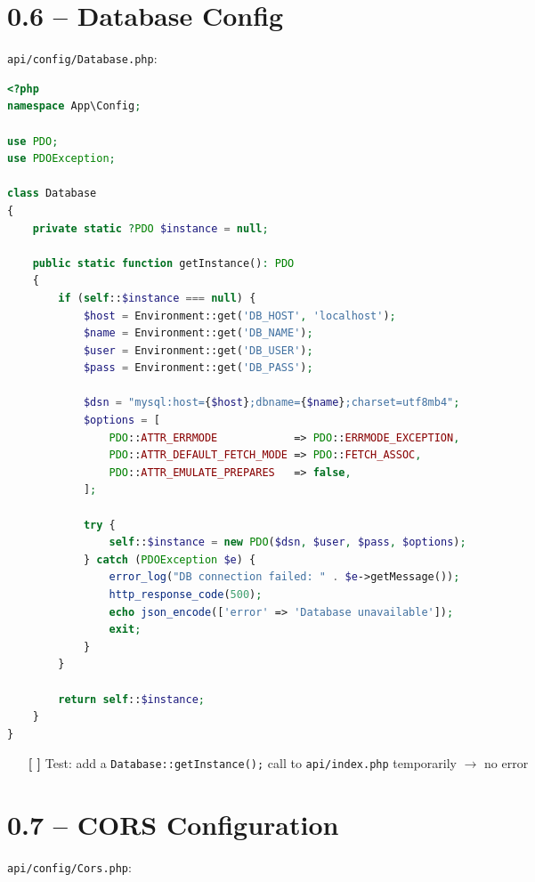 \documentclass[11pt,a4paper]{report}
\newcommand{\todo}{\textcolor{helixamber}{\textbf{[ ]}}}
\newcommand{\filepath}[1]{\texttt{\small#1}}
\begin{document}
\section{0.6 -- Database Config}

\filepath{api/config/Database.php}:

\begin{lstlisting}[language=PHP]
<?php
namespace App\Config;

use PDO;
use PDOException;

class Database
{
    private static ?PDO $instance = null;

    public static function getInstance(): PDO
    {
        if (self::$instance === null) {
            $host = Environment::get('DB_HOST', 'localhost');
            $name = Environment::get('DB_NAME');
            $user = Environment::get('DB_USER');
            $pass = Environment::get('DB_PASS');

            $dsn = "mysql:host={$host};dbname={$name};charset=utf8mb4";
            $options = [
                PDO::ATTR_ERRMODE            => PDO::ERRMODE_EXCEPTION,
                PDO::ATTR_DEFAULT_FETCH_MODE => PDO::FETCH_ASSOC,
                PDO::ATTR_EMULATE_PREPARES   => false,
            ];

            try {
                self::$instance = new PDO($dsn, $user, $pass, $options);
            } catch (PDOException $e) {
                error_log("DB connection failed: " . $e->getMessage());
                http_response_code(500);
                echo json_encode(['error' => 'Database unavailable']);
                exit;
            }
        }

        return self::$instance;
    }
}
\end{lstlisting}

\begin{itemize}
    \item[\todo] Test: add a \texttt{Database::getInstance();} call to \filepath{api/index.php} temporarily $\rightarrow$ no error
\end{itemize}

\section{0.7 -- CORS Configuration}

\filepath{api/config/Cors.php}:
\end{document}
